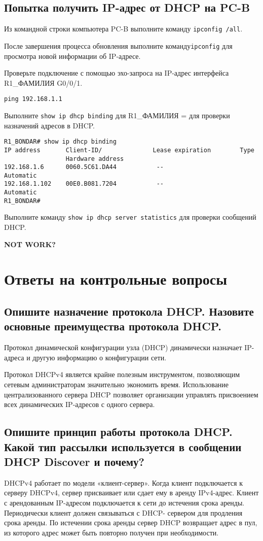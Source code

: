 \subsection{Попытка получить IP-адрес от DHCP на PC-B}

Из командной строки компьютера PC-B выполните команду \texttt{ipconfig /all}.

После завершения процесса обновления выполните команду\texttt{ipconfig} 
для просмотра новой информации об IP-адресе.

Проверьте подключение с помощью эхо-запроса
на IP-адрес интерфейса R1\_ФАМИЛИЯ G0/0/1.

\begin{verbatim}
ping 192.168.1.1
\end{verbatim}

Выполните \texttt{show ip dhcp binding} для R1\_ФАМИЛИЯ =
для проверки назначений адресов в DHCP.

\begin{verbatim}
R1_BONDAR# show ip dhcp binding 
IP address       Client-ID/              Lease expiration        Type
                 Hardware address
192.168.1.6      0060.5C61.DA44           --                     Automatic
192.168.1.102    00E0.B081.7204           --                     Automatic
R1_BONDAR#
\end{verbatim}

Выполните команду \texttt{show ip dhcp server statistics}
для проверки сообщений DHCP.

\textbf{NOT WORK?}

\section{Ответы на контрольные вопросы}
\subsection{Опишите назначение протокола DHCP. Назовите основные 
преимущества протокола DHCP.}
Протокол динамической конфигурации узла (DHCP) динамически 
назначает IP-адреса и другую информацию о конфигурации сети.

Протокол DHCPv4 является крайне полезным инструментом, 
позволяющим сетевым администраторам значительно экономить время.
Использование централизованного сервера DHCP позволяет 
организации управлять присвоением всех динамических IP-адресов с одного 
сервера.

\subsection{Опишите принцип работы протокола DHCP. Какой тип 
рассылки используется в сообщении DHCP Discover и почему?}
DHCPv4 работает по модели «клиент-сервер». Когда клиент 
подключается к серверу DHCPv4, сервер присваивает или сдает ему в аренду 
IPv4-адрес. Клиент с арендованным IP-адресом подключается к сети до 
истечения срока аренды. Периодически клиент должен связываться с DHCP-
сервером для продления срока аренды. По истечении срока аренды сервер 
DHCP возвращает адрес в пул, из которого адрес может быть повторно 
получен при необходимости.

